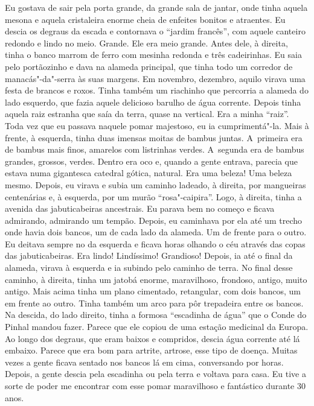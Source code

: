 Eu gostava de sair pela porta grande, da grande sala de jantar, onde
tinha aquela mesona e aquela cristaleira enorme cheia de enfeites
bonitos e atraentes. Eu descia os degraus da escada e contornava o
``jardim francês'', com aquele canteiro redondo e lindo no meio. Grande.
Ele era meio grande. Antes dele, à direita, tinha o banco marrom de
ferro com mesinha redonda e três cadeirinhas. Eu saia pelo portãozinho e
dava na alameda principal, que tinha todo um corredor de
manacás"-da"-serra às suas margens. Em novembro, dezembro, aquilo virava
uma festa de brancos e roxos. Tinha também um riachinho que percorria a
alameda do lado esquerdo, que fazia aquele delicioso barulho de água
corrente. Depois tinha aquela raiz estranha que saía da terra, quase na
vertical. Era a minha ``raiz''. Toda vez que eu passava naquele pomar
majestoso, eu ia cumprimentá"-la. Mais à frente, à esquerda, tinha duas
imensas moitas de bambus juntas. A~primeira era de bambus mais finos,
amarelos com listrinhas verdes. A~segunda era de bambus grandes,
grossos, verdes. Dentro era oco e, quando a gente entrava, parecia que
estava numa gigantesca catedral gótica, natural. Era uma beleza! Uma
beleza mesmo. Depois, eu virava e subia um caminho ladeado, à direita,
por mangueiras centenárias e, à esquerda, por um murão ``rosa"-caipira''.
Logo, à direita, tinha a avenida das jabuticabeiras ancestrais. Eu
parava bem no começo e ficava admirando, admirando um tempão. Depois, eu
caminhava por ela até um trecho onde havia dois bancos, um de cada lado
da alameda. Um de frente para o outro. Eu deitava sempre no da esquerda
e ficava horas olhando o céu através das copas das jabuticabeiras. Era
lindo! Lindíssimo! Grandioso! Depois, ia até o final da alameda, virava
à esquerda e ia subindo pelo caminho de terra. No final desse caminho, à
direita, tinha um jatobá enorme, maravilhoso, frondoso, antigo, muito
antigo. Mais acima tinha um plano cimentado, retangular, com dois
bancos, um em frente ao outro. Tinha também um arco para pôr trepadeira
entre os bancos. Na descida, do lado direito, tinha a formosa
``escadinha de água'' que o Conde do Pinhal mandou fazer. Parece que ele
copiou de uma estação medicinal da Europa. Ao longo dos degraus, que
eram baixos e compridos, descia água corrente até lá embaixo. Parece que
era bom para artrite, artrose, esse tipo de doença. Muitas vezes a gente
ficava sentado nos bancos lá em cima, conversando por horas. Depois, a
gente descia pela escadinha ou pela terra e voltava para casa. Eu tive a
sorte de poder me encontrar com esse pomar maravilhoso e fantástico
durante 30 anos.


